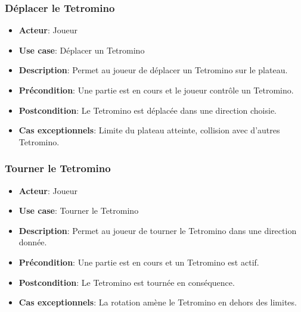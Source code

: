 \documentclass{article}
\begin{document}
\subsubsection*{Déplacer le Tetromino}
\begin{itemize}
    \item \textbf{Acteur}: Joueur
    \item \textbf{Use case}: Déplacer un Tetromino
    \item \textbf{Description}: Permet au joueur de déplacer un Tetromino sur le plateau.
    \item \textbf{Précondition}: Une partie est en cours et le joueur contrôle un Tetromino.
    \item \textbf{Postcondition}: Le Tetromino est déplacée dans une direction choisie.
    \item \textbf{Cas exceptionnels}: Limite du plateau atteinte, collision avec d'autres Tetromino.
\end{itemize}

\subsubsection*{Tourner le Tetromino}
\begin{itemize}
    \item \textbf{Acteur}: Joueur
    \item \textbf{Use case}: Tourner le Tetromino
    \item \textbf{Description}: Permet au joueur de tourner le Tetromino dans une direction donnée.
    \item \textbf{Précondition}: Une partie est en cours et un Tetromino est actif.
    \item \textbf{Postcondition}: Le Tetromino est tournée en conséquence.
    \item \textbf{Cas exceptionnels}: La rotation amène le Tetromino en dehors des limites.
\end{itemize}

\end{document}
